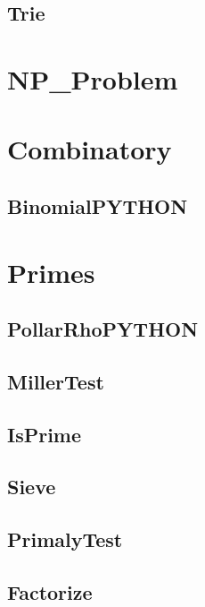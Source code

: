\subsection{ Trie}
\raggedbottom
\hrulefill

\section{NP_Problem}

\section{Combinatory}
\subsection{ BinomialPYTHON}
\raggedbottom
\hrulefill

\section{Primes}
\subsection{ PollarRhoPYTHON}
\raggedbottom
\hrulefill
\subsection{ MillerTest}
\raggedbottom
\hrulefill
\subsection{ IsPrime}
\raggedbottom
\hrulefill
\subsection{ Sieve}
\raggedbottom
\hrulefill
\subsection{ PrimalyTest}
\raggedbottom
\hrulefill
\subsection{ Factorize}
\raggedbottom
\hrulefill

